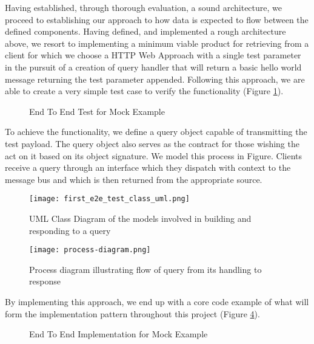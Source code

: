 Having established, through thorough evaluation, a sound architecture, we proceed to establishing our approach to how data is expected to flow between the defined components. Having defined, and implemented a rough architecture above, we resort to implementing a minimum viable product for retrieving from a client for which we choose a HTTP Web Approach with a single test parameter in the pursuit of a creation of query handler that will return a basic hello world message returning the test parameter appended. Following this approach, we are able to create a very simple test case to verify the functionality (Figure \ref{fig:e2eMockTest}).

\begin{figure}[h!]
		\centering
		
		\caption{End To End Test for Mock Example}
		\label{fig:e2eMockTest}
\end{figure}

To achieve the functionality, we define a query object capable of transmitting the test payload. The query object also serves as the contract for those wishing the act on it based on its object signature. We model this process in Figure. Clients receive a query through an interface which they dispatch with context to the message bus and which is then returned from the appropriate source. 

\begin{figure}[h!]
	\centering
	\texttt{[image: first\_e2e\_test\_class\_uml.png]}
	\caption{UML Class Diagram of the models involved in building and responding to a query}
	\label{fig:firste2etestclassuml}
\end{figure}

\begin{figure}[h!]
	\centering
	\texttt{[image: process-diagram.png]}
	\caption{Process diagram illustrating flow of query from its handling to response}
	\label{fig:processSequenceQueryFlow}
\end{figure}

By implementing this approach, we end up with a core code example of what will form the implementation pattern throughout this project (Figure \ref{fig:e2eMockClass}).


\begin{figure}[h!]
	\centering
	
	\caption{End To End Implementation for Mock Example}
	\label{fig:e2eMockClass}
\end{figure}









